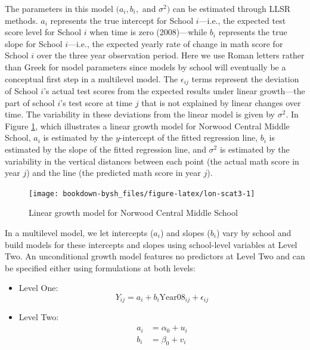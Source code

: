 \documentclass[
]{krantz}
\begin{document}
The parameters in this model \((a_{i}, b_{i},\) and \(\sigma^2)\) can be estimated through LLSR methods. \(a_{i}\) represents the true intercept for School \(i\)---i.e., the expected test score level for School \(i\) when time is zero (2008)---while \(b_{i}\) represents the true slope for School \(i\)---i.e., the expected yearly rate of change in math score for School \(i\) over the three year observation period. Here we use Roman letters rather than Greek for model parameters since models by school will eventually be a conceptual first step in a multilevel model. The \(\epsilon_{ij}\) terms represent the deviation of School \(i\)'s actual test scores from the expected results under linear growth---the part of school \(i\)'s test score at time \(j\) that is not explained by linear changes over time. The variability in these deviations from the linear model is given by \(\sigma^2\). In Figure \ref{fig:lon-scat3}, which illustrates a linear growth model for Norwood Central Middle School, \(a_{i}\) is estimated by the \(y\)-intercept of the fitted regression line, \(b_{i}\) is estimated by the slope of the fitted regression line, and \(\sigma^2\) is estimated by the variability in the vertical distances between each point (the actual math score in year \(j\)) and the line (the predicted math score in year \(j\)).

\begin{figure}

{\centering \texttt{[image: bookdown-bysh\_files/figure-latex/lon-scat3-1]} 

}

\caption{Linear growth model for Norwood Central Middle School}\label{fig:lon-scat3}
\end{figure}

In a multilevel model, we let intercepts (\(a_{i}\)) and slopes (\(b_{i}\)) vary by school and build models for these intercepts and slopes using school-level variables at Level Two. An unconditional growth model features no predictors at Level Two and can be specified either using formulations at both levels:

\begin{itemize}
\item
  Level One:
  \begin{equation*}
  Y_{ij}=a_{i}+b_{i}\textrm{Year08}_{ij} + \epsilon_{ij}
  \end{equation*}
\item
  Level Two:
  \begin{align*}
  a_{i}&=\alpha_{0} + u_{i}\\
  b_{i}&=\beta_{0} + v_{i}
  \end{align*}
\end{itemize}
\end{document}

